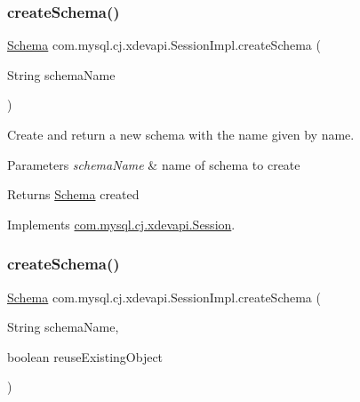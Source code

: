 \subsubsection{\texorpdfstring{create\+Schema()}{createSchema()}\hspace{0.1cm}{\footnotesize\ttfamily [1/2]}}
{\footnotesize\ttfamily \mbox{\hyperlink{interfacecom_1_1mysql_1_1cj_1_1xdevapi_1_1_schema}{Schema}} com.\+mysql.\+cj.\+xdevapi.\+Session\+Impl.\+create\+Schema (\begin{DoxyParamCaption}\item[{String}]{schema\+Name }\end{DoxyParamCaption})}

Create and return a new schema with the name given by name.


\begin{DoxyParams}{Parameters}
{\em schema\+Name} & name of schema to create \\
\hline
\end{DoxyParams}
\begin{DoxyReturn}{Returns}
\mbox{\hyperlink{interfacecom_1_1mysql_1_1cj_1_1xdevapi_1_1_schema}{Schema}} created 
\end{DoxyReturn}


Implements \mbox{\hyperlink{interfacecom_1_1mysql_1_1cj_1_1xdevapi_1_1_session_a09866b1dd34b22cfc24ef9517387da9f}{com.\+mysql.\+cj.\+xdevapi.\+Session}}.

\mbox{\label{classcom_1_1mysql_1_1cj_1_1xdevapi_1_1_session_impl_ae98234f9b7a73f758946297806aeb639}} 
\subsubsection{\texorpdfstring{create\+Schema()}{createSchema()}\hspace{0.1cm}{\footnotesize\ttfamily [2/2]}}
{\footnotesize\ttfamily \mbox{\hyperlink{interfacecom_1_1mysql_1_1cj_1_1xdevapi_1_1_schema}{Schema}} com.\+mysql.\+cj.\+xdevapi.\+Session\+Impl.\+create\+Schema (\begin{DoxyParamCaption}\item[{String}]{schema\+Name,  }\item[{boolean}]{reuse\+Existing\+Object }\end{DoxyParamCaption})}

